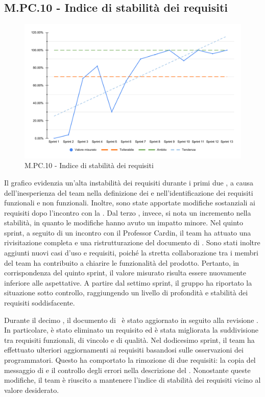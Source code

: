 \subsection{M.PC.10 - Indice di stabilità dei requisiti}
\begin{figure}[H]
    \centering
    \includegraphics[width=\textwidth]{assets/stabilita_requisiti.pdf}
    \caption{M.PC.10 - Indice di stabilità dei requisiti}
\end{figure}

\par Il grafico evidenzia un'alta instabilità dei requisiti durante i primi due , a causa dell'inesperienza del team nella definizione dei  e nell'identificazione dei requisiti funzionali e non funzionali. Inoltre, sono state apportate modifiche sostanziali ai requisiti dopo l'incontro con la . Dal terzo , invece, si nota un incremento nella stabilità, in quanto le modifiche hanno avuto un impatto minore. Nel quinto sprint, a seguito di un incontro con il Professor Cardin, il team ha attuato una rivisitazione completa e una ristrutturazione del documento di \AdR. Sono stati inoltre aggiunti nuovi casi d'uso e requisiti, poiché la stretta collaborazione tra i membri del team ha contribuito a chiarire le funzionalità del prodotto. Pertanto, in corrispondenza del quinto sprint, il valore misurato risulta essere nuovamente inferiore alle aspettative. A partire dal settimo sprint, il gruppo ha riportato la situazione sotto controllo, raggiungendo un livello di profondità e stabilità dei requisiti soddisfacente.

\par Durante il decimo , il documento di \AdR\ è stato aggiornato in seguito alla revisione . In particolare, è stato eliminato un requisito ed è stata migliorata la suddivisione tra requisiti funzionali, di vincolo e di qualità. Nel dodicesimo sprint, il team ha effettuato ulteriori aggiornamenti ai requisiti basandosi sulle osservazioni dei programmatori. Questo ha comportato la rimozione di due requisiti: la copia del messaggio di  e il controllo degli errori nella descrizione del . Nonostante queste modifiche, il team è riuscito a mantenere l'indice di stabilità dei requisiti vicino al valore desiderato.
